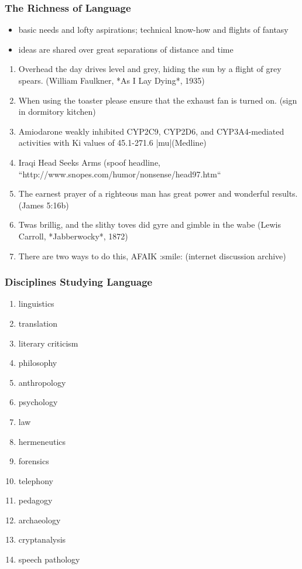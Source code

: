 \documentclass[presentation]{beamer}
\begin{document}
\begin{frame}
\frametitle{The Richness of Language}
\begin{itemize}
\item basic needs and lofty aspirations; technical know-how and
  flights of fantasy
\item ideas are shared over great separations of distance and time
\end{itemize}

\begin{enumerate}
\item Overhead the day drives level and grey, hiding the sun by a flight
   of grey spears.  (William Faulkner, *As I Lay Dying*, 1935)
\item When using the toaster please ensure that the exhaust fan is turned
   on. (sign in dormitory kitchen)
\item Amiodarone weakly inhibited CYP2C9, CYP2D6, and CYP3A4-mediated
   activities with Ki values of 45.1-271.6 |mu|\M (Medline)
\item Iraqi Head Seeks Arms (spoof headline, ``http://www.snopes.com/humor/nonsense/head97.htm``
\item The earnest prayer of a righteous man has great power and wonderful
   results. (James 5:16b)
\item Twas brillig, and the slithy toves did gyre and gimble in the wabe
   (Lewis Carroll, *Jabberwocky*, 1872)
\item There are two ways to do this, AFAIK :smile:  (internet discussion archive)
\end{enumerate}
\end{frame}

\begin{frame}
\frametitle{Disciplines Studying Language}
\begin{enumerate}
\item linguistics
\item translation
\item literary criticism
\item philosophy
\item anthropology
\item psychology
\item law
\item hermeneutics
\item forensics
\item telephony
\item pedagogy
\item archaeology
\item cryptanalysis
\item speech pathology
\end{enumerate}
\end{frame}
\end{document}
